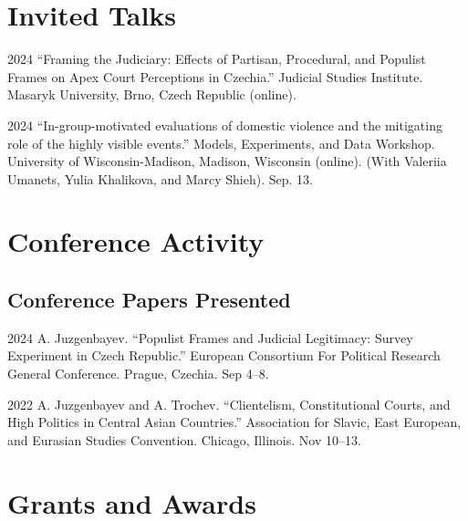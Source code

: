 \documentclass[11pt,letterpaper]{report}
\begin{document}
    \section*{Invited Talks}

   \begin{tablist}

    \item[2024] \tab{}\enquote{Framing the Judiciary: Effects of Partisan, Procedural, and Populist Frames on Apex Court Perceptions in Czechia.} Judicial Studies Institute. Masaryk University, Brno, Czech Republic (online). 
    
    \item[2024] \tab{}\enquote{In-group-motivated evaluations of domestic violence and the mitigating role of the highly visible events.} Models, Experiments, and Data Workshop. University of Wisconsin-Madison, Madison, Wisconsin (online). (With Valeriia Umanets, Yulia Khalikova, and Marcy Shieh). Sep. 13.

    \end{tablist}

    


    \section*{Conference Activity}

    

    \subsection*{Conference Papers Presented}

    \begin{tablist}

        \item[2024] \tab{}A. Juzgenbayev. \enquote{Populist Frames and Judicial Legitimacy: Survey Experiment in Czech Republic.} European Consortium For Political Research General Conference.  Prague, Czechia. Sep 4--8. 

        \item[2022] \tab{}A. Juzgenbayev and A. Trochev. \enquote{Clientelism, Constitutional Courts, and High Politics in Central Asian Countries.} Association for Slavic, East European, and Eurasian Studies Convention. Chicago, Illinois. Nov 10--13.

    \end{tablist}



    \section*{Grants and Awards}
\end{document}
